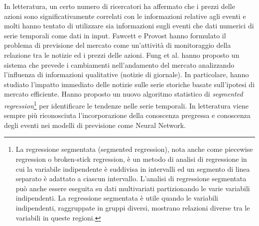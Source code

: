 \documentclass[a4paper,12pt]{report}
\begin{document}
In letteratura, un certo numero di ricercatori ha affermato che i prezzi delle azioni sono significativamente correlati con le informazioni relative agli eventi e molti hanno tentato di utilizzare sia informazioni sugli eventi che dati numerici di serie temporali come dati in input. Fawcett e Provost \cite{4} hanno formulato il problema di previsione del mercato come un'attività di monitoraggio della relazione tra le notizie ed i prezzi delle azioni. Fung et al. \cite{news-nn} hanno proposto un sistema che prevede i cambiamenti nell'andamento del mercato analizzando l'influenza di informazioni qualitative (notizie di giornale). In particolare, hanno studiato l'impatto immediato delle notizie sulle serie storiche basate sull'ipotesi di mercato efficiente. Hanno proposto un nuovo algoritmo statistico di \textit{segmented regression}\footnote{La regressione segmentata (segmented regression), nota anche come piecewise regression o broken-stick regression, è un metodo di analisi di regressione in cui la variabile indipendente è suddivisa in intervalli ed un segmento di linea separato è adattato a ciascun intervallo. L'analisi di regressione segmentata può anche essere eseguita su dati multivariati partizionando le varie variabili indipendenti. La regressione segmentata è utile quando le variabili indipendenti, raggruppate in gruppi diversi, mostrano relazioni diverse tra le variabili in queste regioni.} per identificare le tendenze nelle serie temporali. In letteratura viene sempre più riconosciuta l'incorporazione della conoscenza pregressa e conoscenza degli eventi nei modelli di previsione come Neural Network.
\end{document}

